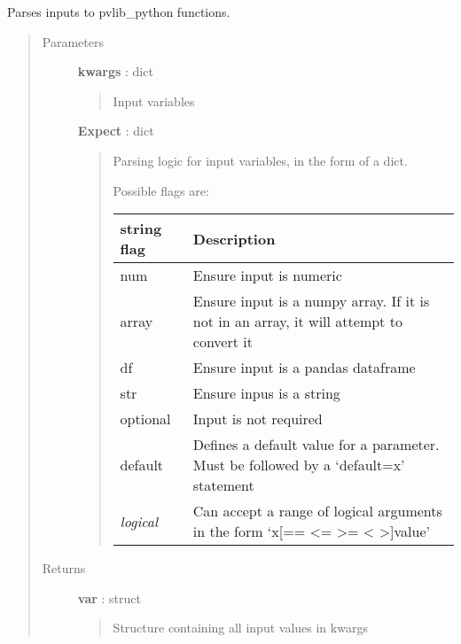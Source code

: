 \documentclass[letterpaper,10pt,english]{sphinxmanual}
\begin{document}
\begin{fulllineitems}
\label{stubs/pvlib.pvl_tools.Parse:pvlib.pvl_tools.Parse}
Parses inputs to pvlib\_python functions.
\begin{quote}\begin{description}
\item[{Parameters}] \leavevmode
\textbf{kwargs} : dict
\begin{quote}

Input variables
\end{quote}

\textbf{Expect} : dict
\begin{quote}

Parsing logic for input variables, in the form of a dict.

Possible flags are:

\begin{tabulary}{\linewidth}{|L|L|}
\hline
\textsf{\relax 
string flag
} & \textsf{\relax 
Description
}\\
\hline
num
 & 
Ensure input is numeric
\\

array
 & 
Ensure input is a numpy array. If it is not in an array, it will attempt to convert it
\\

df
 & 
Ensure input is a pandas dataframe
\\

str
 & 
Ensure inpus is a string
\\

optional
 & 
Input is not required
\\

default
 & 
Defines a default value for a parameter. Must be followed by a `default=x' statement
\\

\emph{logical}
 & 
Can accept a range of logical arguments in the form `x{[}== \textless{}= \textgreater{}= \textless{} \textgreater{}{]}value'
\\
\hline\end{tabulary}

\end{quote}

\item[{Returns}] \leavevmode
\textbf{var} : struct
\begin{quote}

Structure containing all input values in kwargs
\end{quote}


\end{description}
\end{quote}
\end{fulllineitems}
\end{document}

